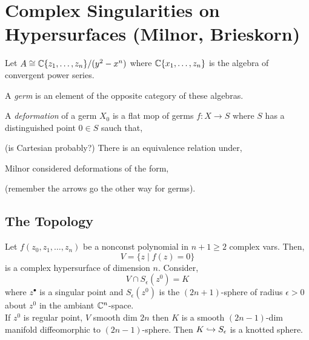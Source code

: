\documentclass[12pt]{article}
\begin{document}
\section{Complex Singularities on Hypersurfaces (Milnor, Brieskorn)}

Let $A \cong \mathbb{C} \{ z_1, \dots, z_n \} / (y^2 - x^n)$ where $\mathbb{C} \{ x_1, \dots, z_n \}$ is the algebra of convergent power series. 

\begin{defn}
A \textit{germ} is an element of the opposite category of these algebras.
\end{defn}

\begin{defn}
A \textit{deformation} of a germ $X_0$ is a flat mop of germs $f : X \to S$ where $S$ has a distinguished point $0 \in S$ sauch that,
\begin{center}
\end{center}
(is Cartesian probably?)
There is an equivalence relation under,
\begin{center}
\end{center}
\end{defn}

\begin{example}
Milnor considered deformations of the form,
\begin{center}
\end{center}
(remember the arrows go the other way for germs).
\end{example}

\subsection{The Topology}

Let $f(z_0, z_1, \dots, z_n)$ be a nonconst polynomial in $n + 1 \ge 2$ complex vars. Then,
\[ V = \{ z \mid f(z) = 0 \} \]
is a complex hypersurface of dimension $n$. Consider,
\[ V \cap S_\epsilon(z^0) = K \]
where $z^\bullet$ is a singular point and $S_\epsilon(z^0)$ is the $(2n+1)$-sphere of radius $\epsilon > 0$ about $z^0$ in the ambiant $\mathbb{C}^n$-space. 
\bigskip\\
If $z^0$ is regular point, $V$ smooth dim $2n$ then $K$ is a smooth $(2n - 1)$-dim manifold diffeomorphic to $(2n - 1)$-sphere. Then $K \hookrightarrow S_\epsilon$ is a knotted sphere.
\end{document}
